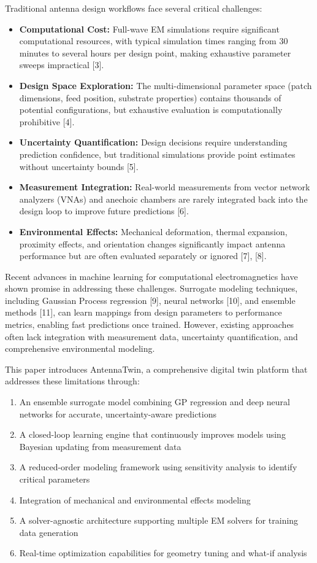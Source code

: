 \documentclass[conference]{IEEEtran}
\begin{document}
Traditional antenna design workflows face several critical challenges:
\begin{itemize}
    \item \textbf{Computational Cost:} Full-wave EM simulations require significant computational resources, with typical simulation times ranging from 30 minutes to several hours per design point, making exhaustive parameter sweeps impractical [3].
    \item \textbf{Design Space Exploration:} The multi-dimensional parameter space (patch dimensions, feed position, substrate properties) contains thousands of potential configurations, but exhaustive evaluation is computationally prohibitive [4].
    \item \textbf{Uncertainty Quantification:} Design decisions require understanding prediction confidence, but traditional simulations provide point estimates without uncertainty bounds [5].
    \item \textbf{Measurement Integration:} Real-world measurements from vector network analyzers (VNAs) and anechoic chambers are rarely integrated back into the design loop to improve future predictions [6].
    \item \textbf{Environmental Effects:} Mechanical deformation, thermal expansion, proximity effects, and orientation changes significantly impact antenna performance but are often evaluated separately or ignored [7], [8].
\end{itemize}

Recent advances in machine learning for computational electromagnetics have shown promise in addressing these challenges. Surrogate modeling techniques, including Gaussian Process regression [9], neural networks [10], and ensemble methods [11], can learn mappings from design parameters to performance metrics, enabling fast predictions once trained. However, existing approaches often lack integration with measurement data, uncertainty quantification, and comprehensive environmental modeling.

This paper introduces AntennaTwin, a comprehensive digital twin platform that addresses these limitations through:
\begin{enumerate}
    \item An ensemble surrogate model combining GP regression and deep neural networks for accurate, uncertainty-aware predictions
    \item A closed-loop learning engine that continuously improves models using Bayesian updating from measurement data
    \item A reduced-order modeling framework using sensitivity analysis to identify critical parameters
    \item Integration of mechanical and environmental effects modeling
    \item A solver-agnostic architecture supporting multiple EM solvers for training data generation
    \item Real-time optimization capabilities for geometry tuning and what-if analysis
\end{enumerate}
\end{document}
